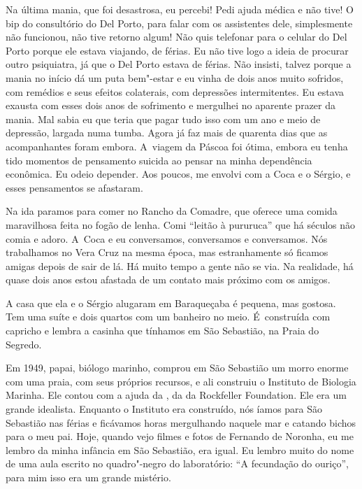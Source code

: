 Na última mania, que foi desastrosa, eu percebi! Pedi ajuda médica e não
tive! O bip do consultório do Del Porto, para falar com os assistentes
dele, simplesmente não funcionou, não tive retorno algum! Não quis
telefonar para o celular do Del Porto porque ele estava viajando, de
férias. Eu não tive logo a ideia de procurar outro psiquiatra, já que o
Del Porto estava de férias. Não insisti, talvez porque a mania no
início dá um puta bem"-estar e eu vinha de dois anos muito sofridos, com
remédios e seus efeitos colaterais, com depressões intermitentes. Eu
estava exausta com esses dois anos de sofrimento e mergulhei no aparente
prazer da mania. Mal sabia eu que teria que pagar tudo isso com um ano e
meio de depressão, largada numa tumba. Agora já faz mais de quarenta
dias que as acompanhantes foram embora. A~viagem da Páscoa foi ótima,
embora eu tenha tido momentos de pensamento suicida ao pensar na minha
dependência econômica. Eu odeio depender. Aos poucos, me envolvi com a
Coca e o Sérgio, e esses pensamentos se afastaram.

Na ida paramos para comer no Rancho da Comadre, que oferece uma comida
maravilhosa feita no fogão de lenha. Comi ``leitão à pururuca'' que há
séculos não comia e adoro. A~Coca e eu conversamos, conversamos e
conversamos. Nós trabalhamos no Vera Cruz na mesma época, mas
estranhamente só ficamos amigas depois de sair de lá. Há muito tempo a
gente não se via. Na realidade, há quase dois anos estou afastada de um
contato mais próximo com os amigos.

A casa que ela e o Sérgio alugaram em Baraqueçaba é pequena, mas
gostosa. Tem uma suíte e dois quartos com um banheiro no meio. É~construída com capricho e lembra a casinha que tínhamos em São
Sebastião, na Praia do Segredo.

Em 1949, papai, biólogo marinho, comprou em São Sebastião um morro
enorme com uma praia, com seus próprios recursos, e ali construiu o
Instituto de Biologia Marinha. Ele contou com a ajuda da , da
 da Rockfeller Foundation. Ele era um grande idealista.
Enquanto o Instituto era construído, nós íamos para São Sebastião nas
férias e ficávamos horas mergulhando naquele mar e catando bichos para o
meu pai. Hoje, quando vejo filmes e fotos de Fernando de Noronha, eu me
lembro da minha infância em São Sebastião, era igual. Eu lembro muito do
nome de uma aula escrito no quadro"-negro do laboratório: ``A fecundação
do ouriço'', para mim isso era um grande mistério.

